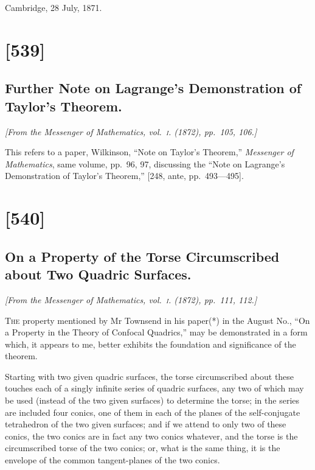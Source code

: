 \documentclass[11pt,a4paper]{article}
\theoremstyle{plain}
\theoremstyle{definition}
\begin{document}
Cambridge, 28 July, 1871.

\clearpage

\section{[539]}
\subsection{Further Note on Lagrange's Demonstration of Taylor's Theorem.}

\begin{center}
\textit{[From the Messenger of Mathematics, vol.~\textsc{i}. (1872), pp.~105, 106.]}
\end{center}

This refers to a paper, Wilkinson, ``Note on Taylor's Theorem,'' \textit{Messenger of Mathematics}, same volume, pp.~96, 97, discussing the ``Note on Lagrange's Demonstration of Taylor's Theorem,'' [248, ante, pp.~493---495].

\clearpage

\section{[540]}
\subsection{On a Property of the Torse Circumscribed about Two Quadric Surfaces.}

\begin{center}
\textit{[From the Messenger of Mathematics, vol.~\textsc{i}. (1872), pp.~111, 112.]}
\end{center}

\textsc{The} property mentioned by Mr Townsend in his paper(*) in the August No., ``On a Property in the Theory of Confocal Quadrics,'' may be demonstrated in a form which, it appears to me, better exhibits the foundation and significance of the theorem.

Starting with two given quadric surfaces, the torse circumscribed about these touches each of a singly infinite series of quadric surfaces, any two of which may be used (instead of the two given surfaces) to determine the torse; in the series are included four conics, one of them in each of the planes of the self-conjugate tetrahedron of the two given surfaces; and if we attend to only two of these conics, the two conics are in fact any two conics whatever, and the torse is the circumscribed torse of the two conics; or, what is the same thing, it is the envelope of the common tangent-planes of the two conics.
\end{document}
